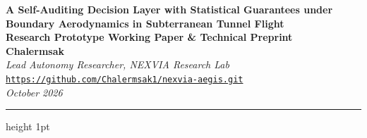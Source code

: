 \documentclass[11pt,a4paper]{article}
\begin{document}
\begin{center}
    {\LARGE \textbf{\color{navyblue} A Self-Auditing Decision Layer with Statistical Guarantees under Boundary Aerodynamics in Subterranean Tunnel Flight}} \\[0.8em]
    {\large \textbf{Research Prototype Working Paper \& Technical Preprint}} \\[1.2em]
    {\textbf{Chalermsak}} \\
    \textit{Lead Autonomy Researcher, NEXVIA Research Lab} \\
    \texttt{\url{https://github.com/Chalermsak1/nexvia-aegis.git}} \\[0.5em]
    \textit{October 2026}
\end{center}

\vspace{0.8em}
\hrule height 1pt
\vspace{1.2em}
\end{document}
